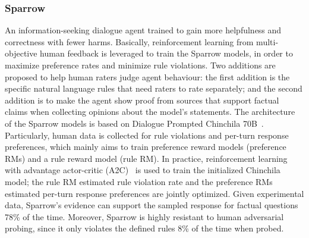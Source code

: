 \subsubsection{Sparrow~\cite{glaese2022improving}}
An information-seeking dialogue agent trained to gain more helpfulness and correctness with fewer harms. Basically, reinforcement learning from multi-objective human feedback is leveraged to train the Sparrow models, in order to maximize preference rates and minimize rule violations. Two additions are proposed to help human raters judge agent behaviour: the first addition is the specific natural language rules that need raters to rate separately; and the second addition is to make the agent show proof from sources that support factual claims when collecting opinions about the model's statements. The architecture of the Sparrow models is based on Dialogue Prompted Chinchila 70B~\cite{chinchilla}. Particularly, human data is collected for rule violations and per-turn response preferences, which mainly aims to train preference reward models (preference RMs) and a rule reward model (rule RM). In practice, reinforcement learning with advantage actor-critic (A2C)~\cite{mnih2016asynchronous} is used to train the initialized Chinchila model; the rule RM estimated rule violation rate and the preference RMs estimated per-turn response preferences are jointly optimized. Given experimental data, Sparrow's evidence can support the sampled response for factual questions 78\% of the time. Moreover, Sparrow is highly resistant to human adversarial probing, since it only violates the defined rules 8\% of the time when probed.



\\


